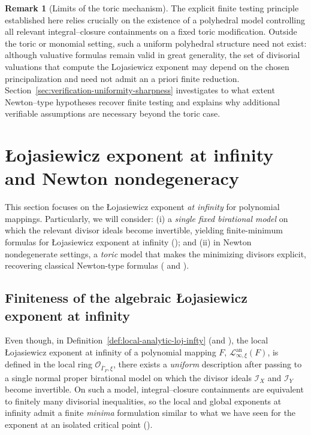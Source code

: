 \documentclass[12pt]{amsart}
\newcommand{\cO}{\mathcal{O}}
\newcommand{\Loj}{\mathcal{L}} %
\theoremstyle{plain}
\theoremstyle{definition}
\newtheorem{remark}[theorem]{Remark}
\numberwithin{equation}{section}
\begin{document}
\begin{remark}[Limits of the toric mechanism]\label{rem:toric-filtration-finite-max}
	The explicit finite testing principle established here relies crucially on the existence of
	a polyhedral model controlling all relevant integral--closure containments on a fixed toric
	modification.
	Outside the toric or monomial setting, such a uniform polyhedral structure need not exist:
	although valuative formulas remain valid in great generality, the set of divisorial valuations
	that compute the Lojasiewicz exponent may depend on the chosen principalization and need
	not admit an a priori finite reduction.
	Section~\ref{sec:verification-uniformity-sharpness} investigates to what extent Newton--type hypotheses recover finite testing
	and explains why additional verifiable assumptions are necessary beyond the toric case.
\end{remark}

\section{\L{}ojasiewicz exponent at infinity and Newton nondegeneracy}\label{sec:NND}

This section focuses on the \L{}ojasiewicz exponent \emph{at infinity} for polynomial mappings.
Particularly, we will consider:
(i) a \emph{single fixed birational model} on which the relevant divisor ideals become invertible, yielding
finite-minimum formulas for \L{}ojasiewicz exponent at infinity (); and
(ii) in Newton nondegenerate settings, a \emph{toric} model that makes the minimizing divisors explicit,
recovering classical Newton-type formulas ( and ).

\subsection{Finiteness of the algebraic \L{}ojasiewicz exponent at infinity}\label{subsec:13.2}

Even though, in Definition~\ref{def:local-analytic-loj-infty} (and ), the local \L{}ojasiewicz exponent at infinity of a polynomial mapping $F$, $\Loj^{\text{an}}_{\infty,\xi}(F)$, is defined in the local ring
$\cO_{\overline{\Gamma}_F,\xi}$, there exists a \emph{uniform} description after passing to a single normal
proper birational model on which the divisor ideals $\mathscr I_X$ and $\mathscr I_Y$ become invertible.
On such a model, integral--closure containments are equivalent to finitely many divisorial inequalities,
so the local and global exponents at infinity admit a finite \emph{minima} formulation similar to what we have seen for the exponent at an isolated critical point ().
\end{document}
